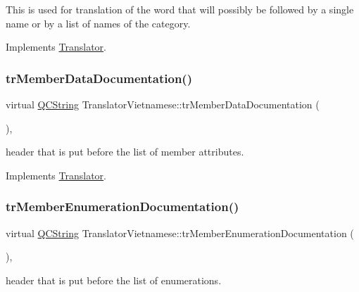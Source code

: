 This is used for translation of the word that will possibly be followed by a single name or by a list of names of the category. 

Implements \mbox{\hyperlink{class_translator}{Translator}}.

\mbox{\label{class_translator_vietnamese_a5bbac145b50f00180d4dd1463af81f48}} 
\subsubsection{\texorpdfstring{trMemberDataDocumentation()}{trMemberDataDocumentation()}}
{\footnotesize\ttfamily virtual \mbox{\hyperlink{class_q_c_string}{Q\+C\+String}} Translator\+Vietnamese\+::tr\+Member\+Data\+Documentation (\begin{DoxyParamCaption}{ }\end{DoxyParamCaption})\hspace{0.3cm}{\ttfamily [inline]}, {\ttfamily [virtual]}}

header that is put before the list of member attributes. 

Implements \mbox{\hyperlink{class_translator}{Translator}}.

\mbox{\label{class_translator_vietnamese_a07b978a239e1f91a9024ed3bfbfb9a55}} 
\subsubsection{\texorpdfstring{trMemberEnumerationDocumentation()}{trMemberEnumerationDocumentation()}}
{\footnotesize\ttfamily virtual \mbox{\hyperlink{class_q_c_string}{Q\+C\+String}} Translator\+Vietnamese\+::tr\+Member\+Enumeration\+Documentation (\begin{DoxyParamCaption}{ }\end{DoxyParamCaption})\hspace{0.3cm}{\ttfamily [inline]}, {\ttfamily [virtual]}}

header that is put before the list of enumerations. 

